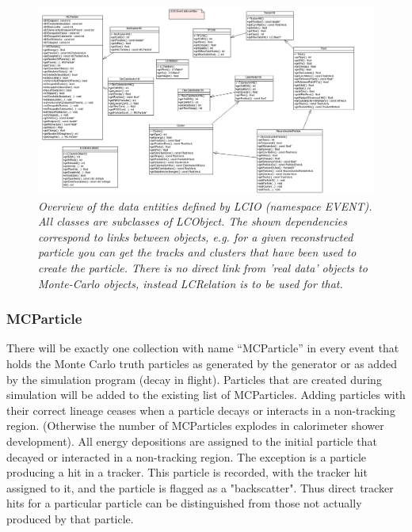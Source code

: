 \documentclass[twoside]{article}
\newcommand{\captionstyle}[1]{\textit{\small{#1}}}
\begin{document}
\begin{figure}
\includegraphics[width=150mm]{lcobjects}    
\caption{\captionstyle{Overview of the data entities defined by LCIO (namespace EVENT). 
All classes are subclasses of LCObject. The shown dependencies correspond to links between objects, e.g.
for a given reconstructed particle you can get the tracks and clusters that have been used to create the particle.
There is no direct link from 'real data' objects to Monte-Carlo objects, instead LCRelation is to be used for 
that.\label{fig_lcobjects}
}}
\end{figure}

\subsubsection{MCParticle}
There will be exactly one collection with name ``MCParticle'' in every event that holds 
the Monte Carlo truth particles as generated by the generator or as added by the simulation program
(decay in flight). Particles that are created during simulation will be added to the existing list of MCParticles.
Adding particles with their correct lineage ceases when a particle decays or interacts in a non-tracking region.
(Otherwise the number of MCParticles explodes in calorimeter shower development).
All energy depositions are assigned to the initial particle that decayed or interacted in a non-tracking region.
The exception is a particle producing a hit in a tracker. This particle is recorded, with the tracker hit 
assigned to it, and the particle is flagged as a "backscatter". Thus direct tracker hits for a particular 
particle can be distinguished from those not actually produced by that particle. 
\end{document}
